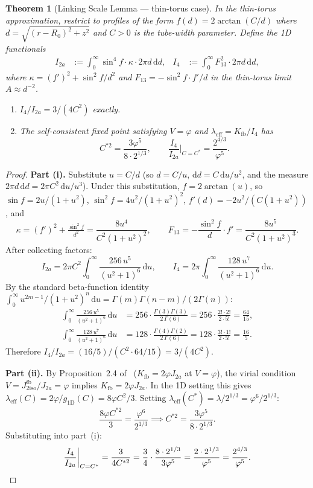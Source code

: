 \documentclass[11pt,a4paper]{article}
\newcommand{\vp}{\varphi}
\newcommand{\lam}{\lambda}
\newcommand{\leff}{\lambda_{\mathrm{eff}}}
\newcommand{\Kfb}{K_{\mathrm{fb}}}
\newcommand{\Jfb}{J_{2\mathrm{iso}}^{\mathrm{fb}}}
\newcommand{\Ja}{J_{2a}}
\newcommand{\kk}{\kappa}
\newcommand{\Ia}{I_{2a}}
\newcommand{\Ib}{I_{4}}
\newtheorem{theorem}{Theorem}[section]
\theoremstyle{remark}
\begin{document}
\begin{theorem}[Linking Scale Lemma --- thin-torus case]
\label{P2:thm:lsl_1d}
In the thin-torus approximation, restrict to profiles of the form
$f(d) = 2\arctan(C/d)$ where $d = \sqrt{(r-R_0)^2+z^2}$ and $C>0$
is the tube-width parameter.  Define the 1D functionals
\begin{align}
  \Ia   &:= \int_0^\infty \sin^4\!f\cdot\kk\cdot 2\pi d\,\mathrm{d}d,
  &
  \Ib   &:= \int_0^\infty F_{13}^2\cdot 2\pi d\,\mathrm{d}d,
\end{align}
where $\kk = (f')^2 + \sin^2\!f/d^2$ and $F_{13} = -\sin^2\!f\cdot f'/d$
in the thin-torus limit $A\approx d^{-2}$.

\begin{enumerate}[label=\textup{(\roman*)}]
\item $\Ib/\Ia = 3/(4C^2)$ exactly.
\item The self-consistent fixed point satisfying $V=\vp$ and
  $\leff = \Kfb/\Ib$ has
  \[
    C^{*2} = \frac{3\vp^5}{8\cdot 2^{1/3}}, \qquad
    \frac{\Ib}{\Ia}\bigg|_{C=C^*} = \frac{2^{4/3}}{\vp^5}.
  \]
\end{enumerate}
\end{theorem}

\begin{proof}
\textbf{Part (i).}
Substitute $u = C/d$ (so $d = C/u$, $\mathrm{d}d = C\,\mathrm{d}u/u^2$,
and the measure $2\pi d\,\mathrm{d}d = 2\pi C^2\,\mathrm{d}u/u^3$).
Under this substitution, $f = 2\arctan(u)$, so
$\sin f = 2u/(1+u^2)$, $\sin^2\!f = 4u^2/(1+u^2)^2$,
$f'(d) = -2u^2/(C(1+u^2))$, and
\[
  \kk = (f')^2 + \tfrac{\sin^2\!f}{d^2}
  = \frac{8u^4}{C^2(1+u^2)^2},
  \qquad
  F_{13} = -\frac{\sin^2\!f}{d}\cdot f' = \frac{8u^5}{C^2(1+u^2)^3}.
\]
After collecting factors:
\[
  \Ia = 2\pi C^2 \int_0^\infty \frac{256\,u^5}{(u^2+1)^6}\,\mathrm{d}u,
  \qquad
  \Ib = 2\pi \int_0^\infty \frac{128\,u^7}{(u^2+1)^6}\,\mathrm{d}u.
\]
By the standard beta-function identity
$\int_0^\infty u^{2m-1}/(1+u^2)^n\,\mathrm{d}u = \Gamma(m)\Gamma(n-m)/(2\Gamma(n))$:
\begin{align*}
  \int_0^\infty \frac{256\,u^5}{(u^2+1)^6}\,\mathrm{d}u
  &= 256\cdot\frac{\Gamma(3)\Gamma(3)}{2\,\Gamma(6)}
  = 256\cdot\frac{2!\cdot 2!}{2\cdot 5!} = \frac{64}{15},\\
  \int_0^\infty \frac{128\,u^7}{(u^2+1)^6}\,\mathrm{d}u
  &= 128\cdot\frac{\Gamma(4)\Gamma(2)}{2\,\Gamma(6)}
  = 128\cdot\frac{3!\cdot 1!}{2\cdot 5!} = \frac{16}{5}.
\end{align*}
Therefore $\Ib/\Ia = (16/5)/(C^2\cdot 64/15) = 3/(4C^2)$.

\textbf{Part (ii).}
By Proposition~2.4 of~\cite{Paper1} ($\Kfb = 2\vp\Ja$ at $V=\vp$),
the virial condition $V=\Jfb/\Ja=\vp$ implies $\Kfb = 2\vp\Ja$.
In the 1D setting this gives $\leff(C) = 2\vp/g_{1\mathrm{D}}(C) = 8\vp C^2/3$.
Setting $\leff(C^*) = \lam/2^{1/3} = \vp^6/2^{1/3}$:
\[
  \frac{8\vp C^{*2}}{3} = \frac{\vp^6}{2^{1/3}}
  \implies
  C^{*2} = \frac{3\vp^5}{8\cdot 2^{1/3}}.
\]
Substituting into part~(i):
\[
  \frac{\Ib}{\Ia}\bigg|_{C=C^*}
  = \frac{3}{4C^{*2}}
  = \frac{3}{4}\cdot\frac{8\cdot 2^{1/3}}{3\vp^5}
  = \frac{2\cdot 2^{1/3}}{\vp^5}
  = \frac{2^{4/3}}{\vp^5}. \qedhere
\]
\end{proof}
\end{document}

